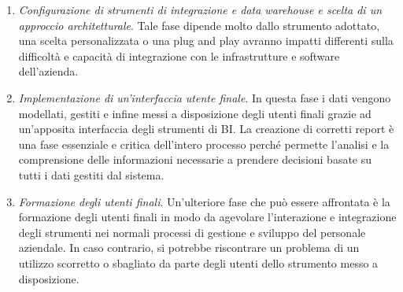 \begin{enumerate}
    \item \textit{Configurazione di strumenti di integrazione e data warehouse e scelta di un approccio architetturale}. Tale fase dipende molto dallo strumento adottato, una scelta personalizzata o una plug and play avranno impatti differenti sulla difficoltà e capacità di integrazione con le infrastrutture e software dell'azienda.
    \item \textit{Implementazione di un'interfaccia utente finale}. In questa fase i dati vengono modellati, gestiti e infine messi a disposizione degli utenti finali grazie ad un'apposita interfaccia degli strumenti di BI. La creazione di corretti report è una fase essenziale e critica dell'intero processo perché permette l'analisi e la comprensione delle informazioni necessarie a prendere decisioni basate su tutti i dati gestiti dal sistema.
    \item \textit{Formazione degli utenti finali}. Un'ulteriore fase che può essere affrontata è la formazione degli utenti finali in modo da agevolare l'interazione e integrazione degli strumenti nei normali processi di gestione e sviluppo del personale aziendale. In caso contrario, si potrebbe riscontrare un problema di un utilizzo scorretto o sbagliato da parte degli utenti dello strumento messo a disposizione.
\end{enumerate}

